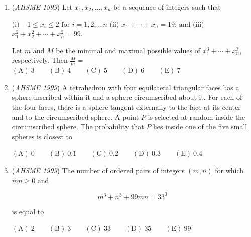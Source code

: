 \begin{enumerate}
 $\mathrm{(A) \ }30 \qquad \mathrm{(B) \ }60 \qquad \mathrm{(C) \ }90 \qquad \mathrm{(D) \ }120 \qquad \mathrm{(E) \ }150$


	\item (\textit{AHSME 1999}) Let $x_1, x_2, \ldots , x_n$ be a sequence of integers such that


 $\text{(i)}$ $-1 \le x_i \le 2$ $\text{for}$ $i = 1,2, \ldots n$
$\text{(ii)}$ $x_1 + \cdots + x_n = 19$; $\text{and}$
$\text{(iii)}$ $x_1^2 + x_2^2 + \cdots + x_n^2 = 99$.


 Let $m$ and $M$ be the minimal and maximal possible values of $x_1^3 + \cdots + x_n^3$, respectively. Then $\frac Mm =$
$\mathrm{(A) \ }3 \qquad \mathrm{(B) \ }4 \qquad \mathrm{(C) \ }5 \qquad \mathrm{(D) \ }6 \qquad \mathrm{(E) \ }7$


	\item (\textit{AHSME 1999}) A tetrahedron with four equilateral triangular faces has a sphere inscribed within it and a sphere circumscribed about it. For each of the four faces, there is a sphere tangent externally to the face at its center and to the circumscribed sphere. A point $P$ is selected at random inside the circumscribed sphere. The probability that $P$ lies inside one of the five small spheres is closest to 


 $\mathrm{(A) \ }0 \qquad \mathrm{(B) \ }0.1 \qquad \mathrm{(C) \ }0.2 \qquad \mathrm{(D) \ }0.3 \qquad \mathrm{(E) \ }0.4$


	\item (\textit{AHSME 1999}) The number of ordered pairs of integers $(m,n)$ for which $mn \ge 0$ and


 
 \[m^3 + n^3 + 99mn = 33^3\]


 is equal to


 $\mathrm{(A) \ }2 \qquad \mathrm{(B) \ } 3\qquad \mathrm{(C) \ } 33\qquad \mathrm{(D) \ }35 \qquad \mathrm{(E) \ } 99$


\end{enumerate}